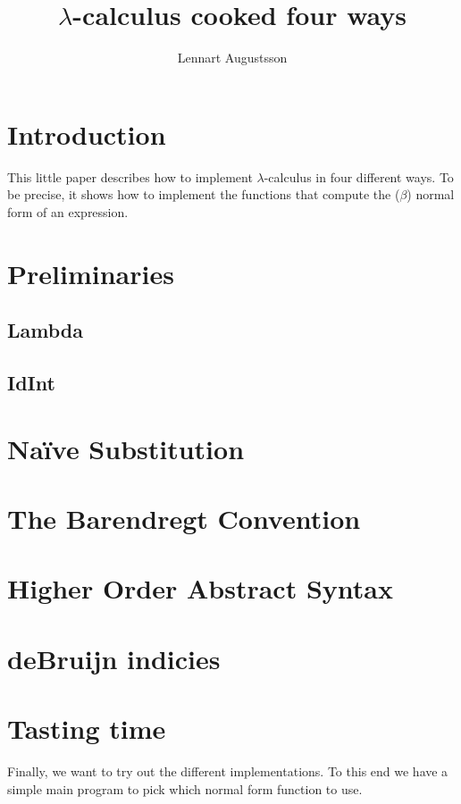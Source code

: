 \documentclass{article}
\date{}
\title{
$\lambda$-calculus cooked four ways
}
\author{
Lennart Augustsson
}
\begin{document}
\maketitle


\section{Introduction}
This little paper describes how to implement $\lambda$-calculus in
four different ways.  To be precise, it shows how to implement the
functions that compute the ($\beta$) normal form of an expression.

\section{Preliminaries}
\subsection{Lambda}

\subsection{IdInt}


\section{Na\"{i}ve Substitution}


\section{The Barendregt Convention}


\section{Higher Order Abstract Syntax}


\section{deBruijn indicies}


\section{Tasting time}
Finally, we want to try out the different implementations.
To this end we have a simple main program to pick which
normal form function to use.


\end{document}
